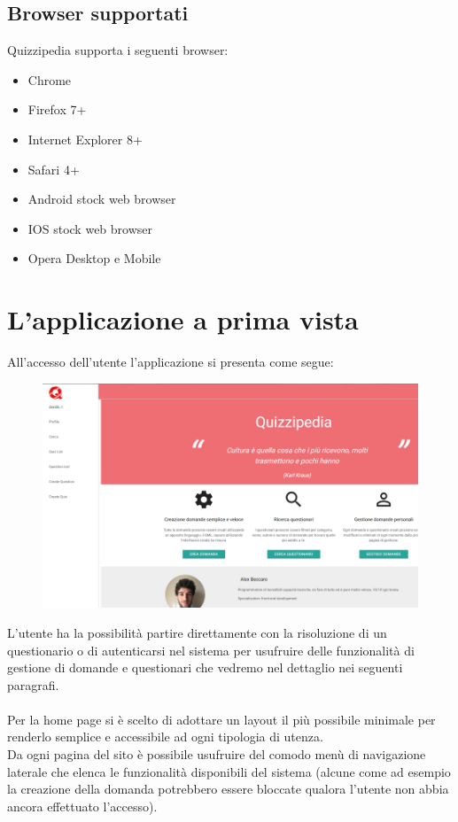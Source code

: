 \documentclass[a4paper,11pt]{article}
\begin{document}
\subsection{Browser supportati}
Quizzipedia supporta i seguenti browser:
\begin{itemize}
	\item Chrome
	\item Firefox 7+
	\item Internet Explorer 8+
	\item Safari 4+
	\item Android stock web browser
	\item IOS stock web browser
	\item Opera Desktop e Mobile
\end{itemize}
	\newpage
	\section{L'applicazione a prima vista}
	All'accesso dell'utente l'applicazione si presenta come segue:\\
	\begin{figure}[h!]
	\begin{center}
	\includegraphics[scale=0.5]{../images/screen_home.png}
	\end{center}
	\end{figure}
	L'utente ha la possibilità partire direttamente con la risoluzione di un questionario o di autenticarsi nel sistema per usufruire delle funzionalità di gestione di domande e questionari che vedremo nel dettaglio nei seguenti paragrafi.\\ \\
	Per la home page si è scelto di adottare un layout il più possibile minimale per renderlo semplice e accessibile ad ogni tipologia di utenza.\\
	Da ogni pagina del sito è possibile usufruire del comodo menù di navigazione laterale che elenca le funzionalità disponibili del sistema (alcune come ad esempio la creazione della domanda potrebbero essere bloccate qualora l'utente non abbia ancora effettuato l'accesso).
	\newpage
\end{document}
